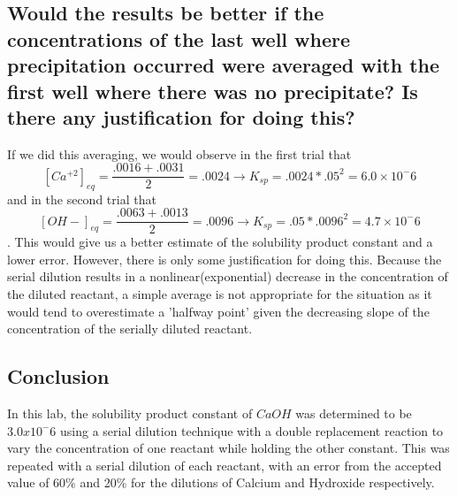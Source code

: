 \documentclass{article}
\begin{document}
\subsection {Would the results be better if the concentrations of the last well where precipitation occurred were averaged with the first well where there was no precipitate? Is there any justification for doing this?}

If we did this averaging, we would observe in the first trial that $$[Ca^{+2}]_{eq} = \frac{.0016+.0031}{2} = .0024 \to K_{sp} = .0024*.05^2 = 6.0\times 10^-6$$ and in the second trial that $$[OH-]_{eq} = \frac{.0063+.0013}{2} = .0096 \to K_{sp} = .05*.0096^2 = 4.7\times 10^-6$$.  This would give us a better estimate of the solubility product constant and a lower error.  However, there is only some justification for doing this.  Because the serial dilution results in a nonlinear(exponential) decrease in the concentration of the diluted reactant, a simple average is not appropriate for the situation as it would tend to overestimate a 'halfway point' given the decreasing slope of the concentration of the serially diluted reactant.

\subsection {Conclusion}
In this lab, the solubility product constant of $CaOH$ was determined to be $3.0x10^-6$ using a serial dilution technique with a double replacement reaction to vary the concentration of one reactant while holding the other constant. This was repeated with a serial dilution of each reactant, with an error from the accepted value of 60\% and 20\% for the dilutions of Calcium and Hydroxide respectively. 
\end{document}
